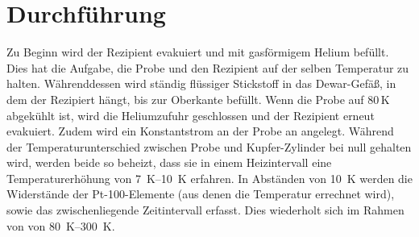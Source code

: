 \section{Durchführung}
\label{sec:Durchführung}
Zu Beginn wird der Rezipient evakuiert und mit gasförmigem Helium befüllt.
Dies hat die Aufgabe, die Probe und den Rezipient auf der selben Temperatur zu halten.
Währenddessen wird ständig flüssiger Stickstoff in das Dewar-Gefäß, in dem der Rezipiert
hängt, bis zur Oberkante befüllt. Wenn die Probe auf 80$\,$K abgekühlt ist, wird die Heliumzufuhr
geschlossen und der Rezipient erneut evakuiert. Zudem wird ein
Konstantstrom an der Probe an angelegt. Während der Temperaturunterschied zwischen
Probe und Kupfer-Zylinder bei null gehalten wird, werden beide so beheizt, dass sie in einem
Heizintervall eine Temperaturerhöhung von \SIrange{7}{10}{\kelvin} erfahren. In Abständen von
\SI{10}{\kelvin} werden die Widerstände der Pt-100-Elemente (aus denen die Temperatur errechnet wird),
sowie das zwischenliegende Zeitintervall erfasst. Dies wiederholt sich im Rahmen von
von \SIrange{80}{300}{\kelvin}.
